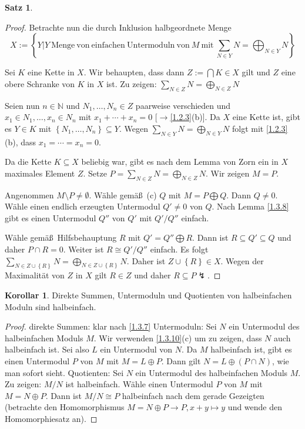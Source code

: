 \documentclass[
twoside=semi,
fontsize=12,
DIV=12, 
cleardoublepage=current,
leqno,
headings=optiontoheadandtoc, 
toc=idx
]{scrbook}
\newcommand{\N}{\mathbb{N}}
\newcommand{\set}[1]{\left\{ #1 \right\}}
\theoremstyle{definition}
\newtheorem{satz}[definition]{Satz}
\newtheorem{korollar}[definition]{Korollar}
\begin{document}
\begin{satz}
\begin{proof}
			\noindent Betrachte nun die durch Inklusion halbgeordnete Menge 
				\[X:= \set{Y\big|Y\ \mathrm{Menge\ von\ einfachen\ Untermoduln\ von}\ M\ \mathrm{mit}\ \sum_{N \in Y}N = \bigoplus_{N \in Y}N}\]
				
			\noindent Sei $K$ eine Kette in $X$. Wir behaupten, dass dann $Z:= \bigcap K \in X$ gilt und $Z$ eine obere Schranke von $K$ in $X$ ist. \newline
			Zu zeigen: $\sum_{N \in Z} N = \bigoplus_{N \in Z} N$
			
			\noindent Seien nun $n \in \N$ und $N_1, \dots, N_n \in Z$ paarweise verschieden und $x_1 \in N_1, \dots, x_n \in N_n$ mit $x_1 + \cdots + x_n = 0$ [$\rightarrow$\ref{1.2.3}(b)]. Da $X$ eine Kette ist, gibt es $Y \in K$ mit $\set{N_1, \dots, N_n} \subseteq Y$. Wegen $\sum_{N \in Y}N = \bigoplus_{N \in Y}N$ folgt mit \ref{1.2.3}(b), dass $x_1 = \cdots = x_n = 0$.
			
			\noindent Da die Kette $K \subseteq X$ beliebig war, gibt es nach dem Lemma von Zorn ein in $X$ maximales Element $Z$. Setze $P = \sum_{N \in Z} N = \bigoplus_{N \in Z}N$. Wir zeigen $M = P$.
			
			\noindent Angenommen $M \setminus P \neq \emptyset$. W\"ahle gem\"a\ss\ (c) $Q$ mit $M = P \bigoplus Q$. Dann $Q \neq 0$. W\"ahle einen endlich erzeugten Untermodul $Q'\neq 0$ von $Q$. Nach Lemma \ref{1.3.8} gibt es einen Untermodul $Q''$ von $Q'$ mit $Q'/Q''$ einfach.
			
			\noindent W\"ahle gem\"a\ss\ Hilfsbehauptung $R$ mit $Q' = Q'' \bigoplus R$. Dann ist $R \subseteq Q' \subseteq Q$ und daher $P \cap R = 0$. Weiter ist $R\cong Q'/Q''$ einfach. Es folgt $\sum_{N \in Z \cup \set{R}}N = \bigoplus_{N \in Z \cup \set{R}}N$. Daher ist $Z\cup \set{R} \in X$. Wegen der Maximalit\"at von $Z$ in $X$ gilt $R \in Z$ und daher $R \subseteq P \lightning$.
 		\end{proof} 
	\end{satz}

	\begin{korollar}\label{1.3.11}
		Direkte Summen, Untermoduln und Quotienten von halbeinfachen Moduln sind halbeinfach.
		
		\begin{proof}
			direkte Summen: klar nach \ref{1.3.7}\newline
			Untermoduln: Sei $N$ ein Untermodul des halbeinfachen Moduls $M$. Wir verwenden \ref{1.3.10}(c) um zu zeigen, dass $N$ auch halbeinfach ist. Sei also $L$ ein Untermodul von $N$. Da $M$ halbeinfach ist, gibt es einen Untermodul $P$ von $M$ mit $M = L \oplus P$. Dann gilt $N = L \oplus (P \cap N)$, wie man sofort sieht.\newline
			Quotienten: Sei $N$ ein Untermodul des halbeinfachen Moduls $M$. Zu zeigen: $M/N$ ist halbeinfach.\newline
			W\"ahle einen Untermodul $P$ von $M$ mit $M = N \oplus P$. Dann ist $M/N \cong P$ halbeinfach nach dem gerade Gezeigten (betrachte den Homomorphismus $M = N \oplus P \to P, x+y \mapsto y$ und wende den Homomorphiesatz an).
		\end{proof}
	\end{korollar}
	\newpage
	
\end{document}
